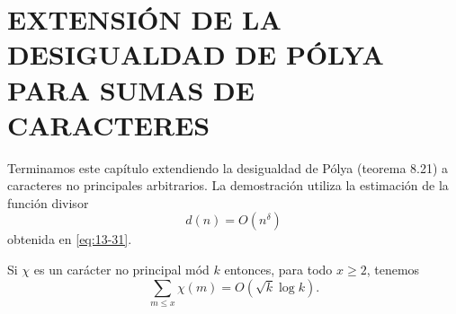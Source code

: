     \section{EXTENSIÓN DE LA DESIGUALDAD DE PÓLYA PARA SUMAS DE CARACTERES}

    Terminamos este capítulo extendiendo la desigualdad de Pólya (teorema 8.21) a caracteres no
    principales arbitrarios. La demostración utiliza la estimación de la función divisor
    \begin{equation*}
        d(n)=O(n^{\delta})
    \end{equation*}
    obtenida en \eqref{eq:13-31}.

    \begin{teorema}\label{teo:13-15}
        Si $\chi$ es un carácter no principal mód $k$ entonces, para todo $x\geq2$, tenemos
        \begin{equation*}
            \sum_{m\leq x}\chi(m)=O(\sqrt{k}\log k).
        \end{equation*}
    \end{teorema}

